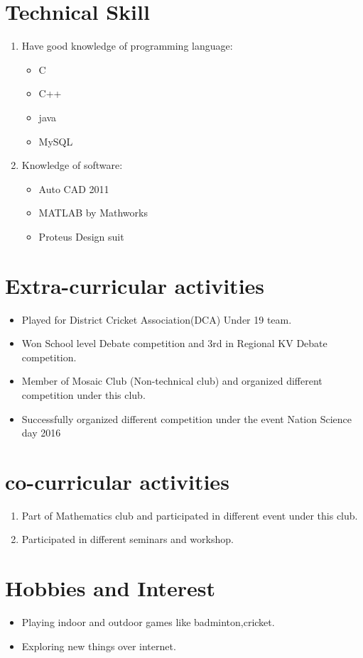 \documentclass[11pt,a4paper]{article}
\begin{document}
\section*{Technical Skill}
\vspace{-0.7em}\hline \vspace{1.5em}
\begin{enumerate}
\item Have good knowledge of programming language:
\begin{itemize}
\item C
\item C++
\item java
\item MySQL
\end{itemize}
\item Knowledge of software:
\begin{itemize}
\item Auto CAD 2011
\item MATLAB by Mathworks
\item Proteus Design suit
\end{itemize}
\end{enumerate}

\section*{Extra-curricular activities}
\vspace{-0.7em}\hline \vspace{1.5em}
\begin{itemize}
\item Played for District Cricket Association(DCA) Under 19 team.
\item Won School level Debate competition and 3rd in Regional KV Debate competition.
\item Member of Mosaic Club (Non-technical club) and organized different competition under this club.
\item Successfully organized different competition under the event Nation Science day 2016
\end{itemize}
\section*{co-curricular activities}
\vspace{-0.7em}\hline \vspace{1.5em}
\begin{enumerate}
\item Part of Mathematics club and participated in different event under this club.
\item Participated in different seminars and workshop.

\end{enumerate}

\section*{Hobbies and Interest}
\vspace{-0.7em}\hline \vspace{1.5em}
\begin{itemize}
\item Playing indoor and outdoor games like badminton,cricket.
\item Exploring new things over internet.
\end{itemize}
\end{document}
